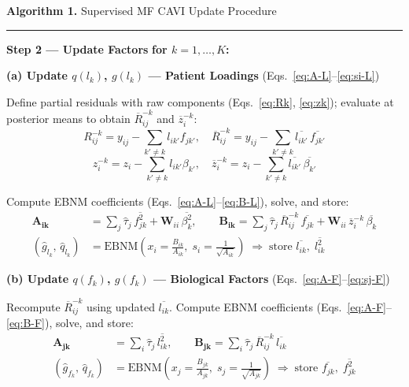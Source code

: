 \documentclass{article}[12pt]
\begin{document}
\begin{algobox}{\textbf{Algorithm 1.} Supervised MF CAVI Update Procedure}
\medskip
\hrule
\medskip

\hspace{1em}\textbf{Step 2 --- Update Factors} \quad\textbf{for $k = 1,\ldots,K$:}

\medskip
\hspace{2em}\textbf{(a) Update $q(l_k)$, $g(l_k)$ --- Patient Loadings}
\quad(Eqs.~\ref{eq:A-L}--\ref{eq:si-L})

\medskip
\hspace{3em}Define partial residuals with raw components (Eqs.~\ref{eq:Rk}, \ref{eq:zk});
evaluate at posterior means to obtain $\overline{R}^{-k}_{ij}$ and $\overline{z}^{-k}_i$:
\[
    R^{-k}_{ij} = y_{ij} - \sum_{k'\neq k} l_{ik'} f_{jk'},
    \quad
    \overline{R}^{-k}_{ij} = y_{ij} - \sum_{k'\neq k}\overline{l_{ik'}}\,\overline{f_{jk'}}
\]
\[
    z_i^{-k} = z_i - \sum_{k'\neq k} l_{ik'}\beta_{k'},
    \quad
    \overline{z}^{-k}_i = z_i - \sum_{k'\neq k}\overline{l_{ik'}}\,\overline{\beta_{k'}}
\]

\hspace{3em}Compute EBNM coefficients (Eqs.~\ref{eq:A-L}--\ref{eq:B-L}), solve, and store:
\begin{align*}
    \mathbf{A_{ik}} &= \sum_j \hat{\tau}_j\,\overline{f^2_{jk}} + \mathbf{W}_{ii}\,\overline{\beta^2_k},
    \qquad
    \mathbf{B_{ik}} = \sum_j \hat{\tau}_j\,\overline{R}^{-k}_{ij}\,\overline{f_{jk}}
                    + \mathbf{W}_{ii}\,\overline{z}^{-k}_i\,\overline{\beta_k}\\
    \left(\hat{g}_{l_k},\,\hat{q}_{l_k}\right)
    &= \mathrm{EBNM}\!\left(x_i = \tfrac{B_{ik}}{A_{ik}},\; s_i = \tfrac{1}{\sqrt{A_{ik}}}\right)
    \;\Rightarrow\;\text{store } \overline{l_{ik}},\; \overline{l_{ik}^2}
\end{align*}

\medskip
\hspace{2em}\textbf{(b) Update $q(f_k)$, $g(f_k)$ --- Biological Factors}
\quad(Eqs.~\ref{eq:A-F}--\ref{eq:sj-F})

\medskip
\hspace{3em}Recompute $\overline{R}^{-k}_{ij}$ using updated $\overline{l_{ik}}$.
Compute EBNM coefficients (Eqs.~\ref{eq:A-F}--\ref{eq:B-F}), solve, and store:
\begin{align*}
    \mathbf{A_{jk}} &= \sum_i \hat{\tau}_j\,\overline{l^2_{ik}},
    \qquad
    \mathbf{B_{jk}} = \sum_i \hat{\tau}_j\,\overline{R}^{-k}_{ij}\,\overline{l_{ik}}\\
    \left(\hat{g}_{f_k},\,\hat{q}_{f_k}\right)
    &= \mathrm{EBNM}\!\left(x_j = \tfrac{B_{jk}}{A_{jk}},\; s_j = \tfrac{1}{\sqrt{A_{jk}}}\right)
    \;\Rightarrow\;\text{store } \overline{f_{jk}},\; \overline{f_{jk}^2}
\end{align*}


\end{algobox}
\end{document}

